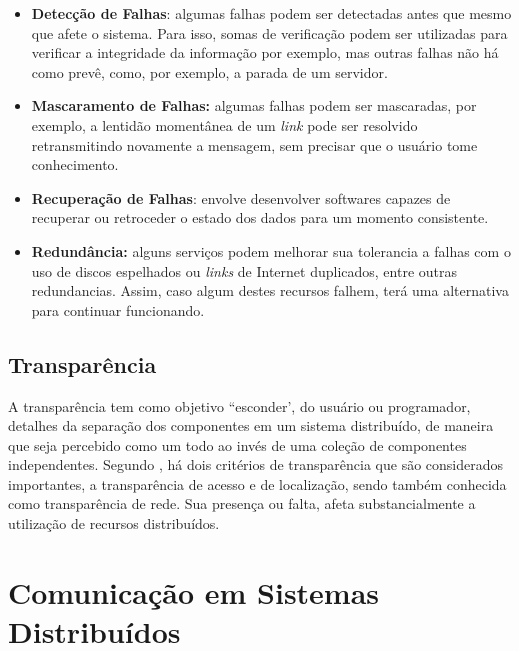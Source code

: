 \documentclass[
	12pt,				%
	oneside,			%
	a4paper,			%
	english,			%
	brazil				%
	]{abntex2ppgsi}
\begin{document}
\begin{itemize}
	\item{\textbf{Detecção de Falhas}: algumas falhas podem ser detectadas antes que mesmo que afete o sistema. Para isso, somas de verificação podem ser utilizadas para verificar a integridade da informação por exemplo, mas outras falhas não há como prevê, como, por exemplo, a parada de um servidor.} 	
	\item{\textbf{Mascaramento de Falhas: } algumas falhas podem ser mascaradas, por exemplo, a lentidão momentânea de um \textit{link} pode ser resolvido retransmitindo novamente a mensagem, sem precisar que o usuário tome conhecimento.}
	\item{\textbf{Recuperação de Falhas}: envolve desenvolver softwares capazes de recuperar ou retroceder o estado dos dados para um momento consistente.}
	\item{\textbf{Redundância:} alguns serviços podem melhorar sua tolerancia a falhas com o uso de discos espelhados ou \textit{links} de Internet duplicados, entre outras redundancias. Assim, caso algum destes recursos falhem, terá uma alternativa para continuar funcionando.}
\end{itemize} 

\subsection{Transparência}

A transparência tem como objetivo ``esconder', do usuário ou programador, detalhes da separação dos componentes em um sistema distribuído, de maneira que seja percebido como um todo ao invés de uma coleção de componentes independentes. Segundo \cite{coulouris2013sistemas}, há dois critérios de transparência que são considerados importantes, a transparência de acesso e de localização, sendo também conhecida como transparência de rede. Sua presença ou falta, afeta substancialmente a utilização de recursos distribuídos.


\section{Comunicação em Sistemas Distribuídos}
\end{document}
